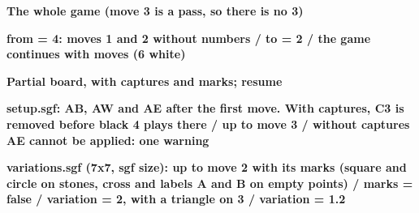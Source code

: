\documentclass{article}
\newcommand\case[1]{\par\medskip\noindent\textbf{#1}\par\nopagebreak}
\begin{document}

\case{The whole game (move 3 is a pass, so there is no 3)}
\begin{goban}[9]\end{goban}

\case{from = 4: moves 1 and 2 without numbers / to = 2 / the game continues with moves (6 white)}
\begin{goban}[9]\end{goban}
\begin{goban}[9]\end{goban}
\begin{goban}[9]\end{goban}

\case{Partial board, with captures and marks; resume}
\begin{goban}[9, captures, name = game, partial = A1:E9, label = {at = all}]
\end{goban}
\begin{goban}[9, resume = {game, numbers, marks}]\end{goban}

\case{setup.sgf: AB, AW and AE after the first move. With captures, C3 is removed before black 4 plays there / up to move 3 / without captures AE cannot be applied: one warning}
\begin{goban}[5, captures]\end{goban}
\begin{goban}[5, captures]\end{goban}
\begin{goban}[5]\end{goban}

\case{variations.sgf (7x7, sgf size): up to move 2 with its marks (square and circle on stones, cross and labels A and B on empty points) / marks = false / variation = 2, with a triangle on 3 / variation = 1.2}
\begin{goban}[sgf size = variations.sgf]\end{goban}
\begin{goban}[sgf size = variations.sgf]\end{goban}
\begin{goban}[sgf size = variations.sgf]\end{goban}
\begin{goban}[sgf size = variations.sgf]\end{goban}
\end{document}
